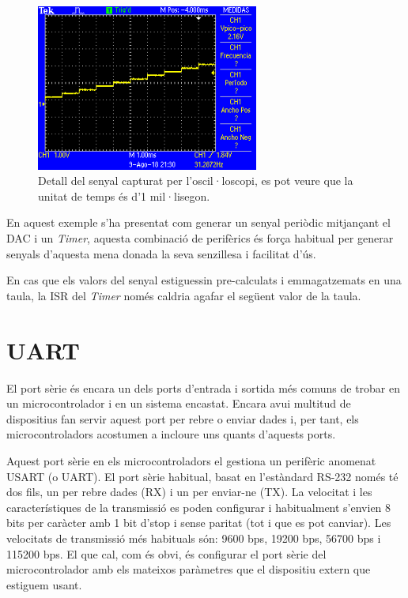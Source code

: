 \begin{figure}
 \centering
 \includegraphics[width=0.65\textwidth, keepaspectratio]{imatges/DAC_result_osc_zoom}
 \caption{Detall del senyal capturat per l'oscil·loscopi, es pot veure que la unitat de temps és d'1 mil·lisegon.}
 \label{fig:DAC_result_zoom}
\end{figure}

En aquest exemple s'ha presentat com generar un senyal periòdic mitjançant el \gls{DAC} i un {\em Timer}, aquesta combinació de perifèrics és força habitual per generar senyals d'aquesta mena donada la seva senzillesa i facilitat d'ús.

En cas que els valors del senyal estiguessin pre-calculats i emmagatzemats en una taula, la \gls{ISR} del {\em Timer} només caldria agafar el següent valor de la taula.

\chapter{UART}
\label{sub:UART}
El port sèrie és encara un dels ports d'entrada i sortida més comuns de trobar en un microcontrolador i en un sistema encastat. Encara avui multitud de dispositius fan servir aquest port per rebre o enviar dades i, per tant, els microcontroladors acostumen a incloure uns quants d'aquests ports.

Aquest port sèrie en els microcontroladors el gestiona un perifèric anomenat \gls{USART} (o \gls{UART}). El port sèrie habitual, basat en l'estàndard RS-232 només té dos fils, un per rebre dades (RX) i un per enviar-ne (TX). La velocitat i les característiques de la transmissió es poden configurar i habitualment s'envien 8 bits per caràcter amb 1 bit d'stop i sense paritat (tot i que es pot canviar). Les velocitats de transmissió més habituals són: 9600 \gls{bps}, 19200 bps, 56700 bps i 115200 bps. El que cal, com és obvi, és configurar el port sèrie del microcontrolador amb els mateixos paràmetres que el dispositiu extern que estiguem usant.

